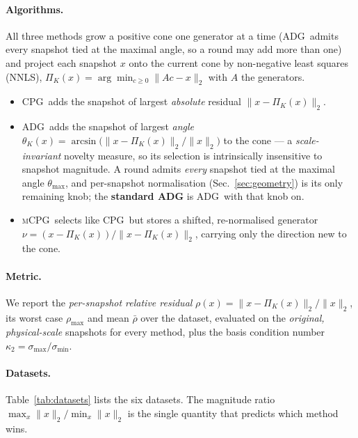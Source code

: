\documentclass[11pt]{article}
\newcommand{\CPG}{\textsc{CPG}}
\newcommand{\ADG}{\textsc{ADG}}
\newcommand{\mCPG}{\textsc{mCPG}}
\begin{document}
\paragraph{Algorithms.}
All three methods grow a positive cone one generator at a time (\ADG\ admits
every snapshot tied at the maximal angle, so a round may add more than one)
and project each snapshot $x$ onto the current cone by non-negative
least squares (NNLS), $\Pi_K(x)=\arg\min_{c\ge0}\|Ac-x\|_2$ with $A$ the
generators.
\begin{itemize}
  \item \CPG\ adds the snapshot of largest \emph{absolute} residual
        $\|x-\Pi_K(x)\|_2$.
  \item \ADG\ adds the snapshot of largest \emph{angle}
        $\theta_K(x)=\arcsin\!\big(\|x-\Pi_K(x)\|_2/\|x\|_2\big)$ to the cone ---
        a \emph{scale-invariant} novelty measure, so its selection is intrinsically
        insensitive to snapshot magnitude. A round admits \emph{every} snapshot tied
        at the maximal angle $\theta_{\max}$, and per-snapshot normalisation
        (Sec.~\ref{sec:geometry}) is its only remaining knob; the \textbf{standard
        \ADG} is \ADG\ with that knob on.
  \item \mCPG\ selects like \CPG\ but stores a shifted, re-normalised generator
        $\nu=(x-\Pi_K(x))/\|x-\Pi_K(x)\|_2$, carrying only the direction new to the
        cone.
\end{itemize}

\paragraph{Metric.}
We report the \emph{per-snapshot relative residual}
$\rho(x)=\|x-\Pi_K(x)\|_2/\|x\|_2$, its worst case $\rho_{\max}$ and mean
$\bar\rho$ over the dataset, evaluated on the \emph{original, physical-scale}
snapshots for every method, plus the basis condition number
$\kappa_2=\sigma_{\max}/\sigma_{\min}$.

\paragraph{Datasets.}
Table~\ref{tab:datasets} lists the six datasets. The magnitude ratio
$\max_x\|x\|_2/\min_x\|x\|_2$ is the single quantity that predicts which method
wins.
\end{document}
